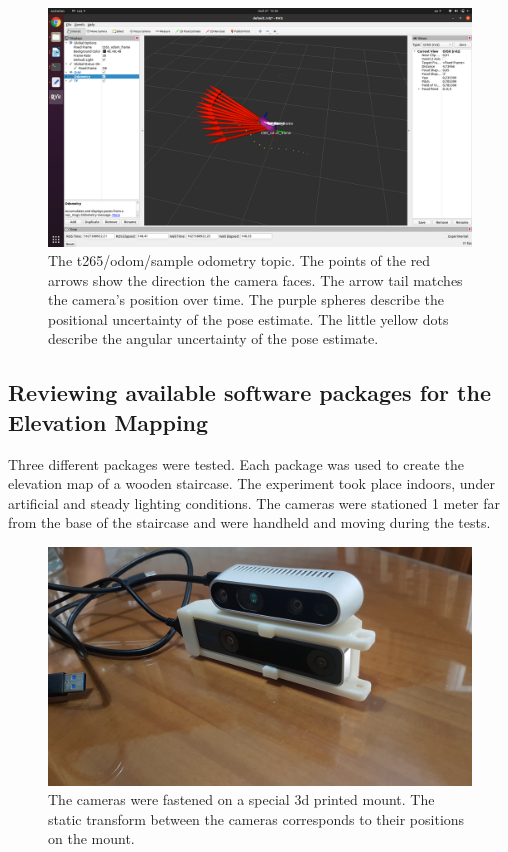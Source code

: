 \documentclass{article}
\begin{document}
\begin{figure}[h] %
    \centering
	\includegraphics[width=\textwidth,height=\textheight,keepaspectratio]{report1-img009.png} %
	\caption{The t265/odom/sample odometry topic. The points of the red arrows show the direction the camera faces. The arrow tail matches the camera's position over time. The purple spheres describe the positional uncertainty of the pose estimate. The little yellow dots describe the angular uncertainty of the pose estimate.}
\end{figure}

\clearpage

\subsection{Reviewing available software packages for the Elevation Mapping}

Three different packages were tested. Each package was used to create the elevation map of a wooden staircase. The experiment took place indoors, under artificial and steady lighting conditions. The cameras were stationed 1 meter far from the base of the staircase and were handheld and moving during the tests. 

\begin{figure}[h] %
    \centering
	\includegraphics[width=\textwidth,height=\textheight,keepaspectratio]{report1-img010.jpg} %
	\caption{The cameras were fastened on a special 3d printed mount. The static transform between the cameras corresponds to their positions on the mount.}
\end{figure}
\end{document}
